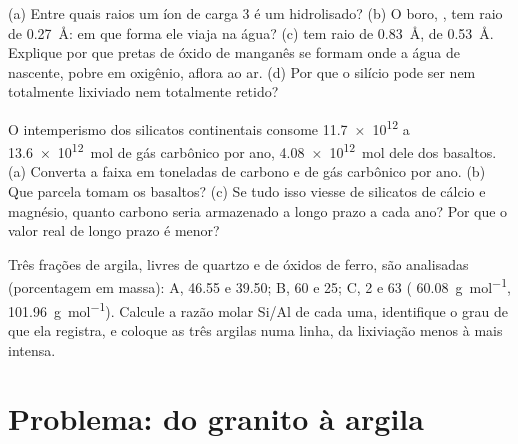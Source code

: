 \begin{exercise}[$\star\star\star$]\label{exo:b1:weathering-clays:10}
(a) Entre quais raios um íon de carga 3 é um hidrolisado? (b) O boro, , tem raio de \qty{0.27}{\angstrom}: em que forma ele viaja na água? (c)  tem raio de \qty{0.83}{\angstrom},  de \qty{0.53}{\angstrom}. Explique por que  pretas de óxido de manganês se formam onde a água de nascente, pobre em oxigênio, aflora ao ar. (d) Por que o silício pode ser nem totalmente lixiviado nem totalmente retido?
\end{exercise}

\begin{exercise}[$\star\star\star$]\label{exo:b1:weathering-clays:11}
O intemperismo dos silicatos continentais consome \num{11.7e12} a
\qty{13.6e12}{mol} de gás carbônico por ano, \qty{4.08e12}{mol} dele dos basaltos. (a) Converta a faixa em toneladas de carbono e de gás carbônico por ano. (b) Que parcela tomam os basaltos? (c) Se tudo isso viesse de silicatos de cálcio e magnésio, quanto carbono seria armazenado a longo prazo a cada ano? Por que o valor real de longo prazo é menor?
\end{exercise}

\begin{exercise}[$\star\star\star$]\label{exo:b1:weathering-clays:12}
Três frações de argila, livres de quartzo e de óxidos de ferro, são analisadas (porcentagem em massa): A,  \num{46.55} e  \num{39.50}; B,  60 e
 25; C,  2 e  63 (
\qty{60.08}{g.mol^{-1}},  \qty{101.96}{g.mol^{-1}}). Calcule a razão molar Si/Al de cada uma, identifique o grau de  que ela registra, e coloque as três argilas numa linha, da lixiviação menos à mais intensa.
\end{exercise}

\section{Problema: do granito à argila}

